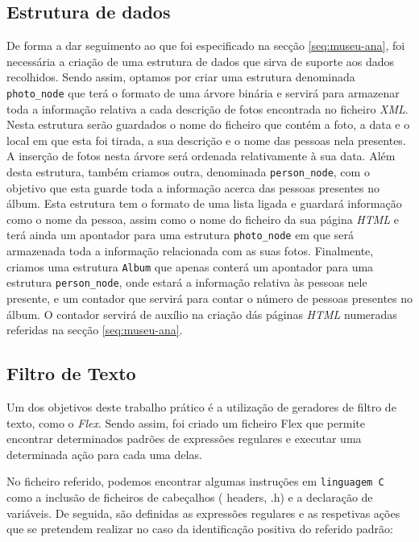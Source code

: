 \subsection{Estrutura de dados}
\label{seq:museu-est}
De forma a dar seguimento ao que foi especificado na secção \ref{seq:museu-ana}, foi necessária a criação de uma estrutura de dados que sirva de suporte aos dados recolhidos. Sendo assim, optamos por criar uma estrutura denominada \verb!photo_node! que terá o formato de uma árvore binária e servirá para armazenar toda a informação relativa a cada descrição de fotos encontrada no ficheiro \emph{XML}. Nesta estrutura serão guardados o nome do ficheiro que contém a foto, a data e o local em que esta foi tirada, a sua descrição e o nome das pessoas nela presentes. A inserção de fotos nesta árvore será ordenada relativamente à sua data.
Além desta estrutura, também criamos outra, denominada \verb!person_node!, com o objetivo que esta guarde toda a informação acerca das pessoas presentes no álbum. Esta estrutura tem o formato de uma lista ligada e guardará informação como o nome da pessoa, assim como o nome do ficheiro da sua página \emph{HTML} e terá ainda um apontador para uma estrutura \verb!photo_node! em que será armazenada toda a informação relacionada com as suas fotos. Finalmente, criamos uma estrutura \verb!Album! que apenas conterá um apontador para uma estrutura \verb!person_node!, onde estará a informação relativa às pessoas nele presente, e um contador que servirá para contar o número de pessoas presentes no álbum. O contador servirá de auxílio na criação dás páginas \emph{HTML} numeradas referidas na secção \ref{seq:museu-ana}.

\subsection{Filtro de Texto}
\label{seq:museu-filtro}
Um dos objetivos deste trabalho prático é a utilização de geradores de filtro de texto, como o \emph{Flex}. Sendo assim, foi criado um ficheiro Flex que permite encontrar determinados padrões de expressões regulares e executar uma determinada ação para cada uma delas.

No ficheiro referido, podemos encontrar algumas instruções em \verb!linguagem C! como a inclusão de ficheiros de cabeçalhos ( headers, .h) e a declaração de variáveis.
De seguida, são definidas as expressões regulares e as respetivas ações que se pretendem realizar no caso da identificação positiva do referido padrão:


